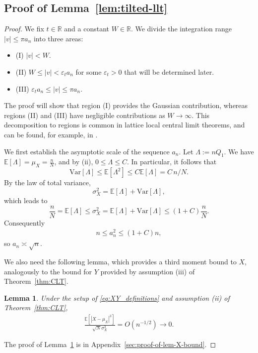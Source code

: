 \documentclass[11pt]{article}
\newtheorem{lem}[thm]{Lemma}
\numberwithin{equation}{section}
\newcommand{\reals}{\mathbb R}
\newcommand{\Var}[1]{\mathrm{Var}\left[ #1\right]}
\newcommand{\ex}[1]{\ensuremath{\mathbb{E}\left[ #1\right]}}
\begin{document}
\subsection{Proof of Lemma~\ref{lem:tilted-llt}}
\label{sec:proof-of-lem-tilted-llt}
\begin{proof}
    We fix $t \in \reals$ and a constant $W \in \reals$. We divide the integration range $|v|\leq \pi a_n$ into three areas:
\begin{itemize}
    \item (I) $|v| < W$.
    \item (II) $W \leq |v| < \varepsilon_t a_n$ for some $\varepsilon_t > 0$ that will be determined later. 
    \item (III) $\varepsilon_t a_n \leq |v| \le \pi a_n$.
\end{itemize}
The proof will show that region (I) provides the Gaussian contribution, whereas regions (II) and (III) have negligible contributions as $W \to \infty$. This decomposition to regions is common in lattice local central limit theorems, and can be found, for example, in \cite{petrov1975sums,holst1979unified,janson2001moment,klein2019conditional}.


We first establish the asymptotic scale of the sequence $a_n$. Let $\Lambda := nQ_1$. We have $\ex{\Lambda}= \mu_X = \frac{n}{N}$, and by (ii), $0 \le \Lambda \le C$. In particular, it follows that 
\[
    \Var{\Lambda} \leq \ex{\Lambda^2} \leq C \ex{\Lambda} = C\,n/N.
\]
By the law of total variance,
\[
\sigma_X^2=\ex{\Lambda}+\Var{\Lambda}, 
\]
which leads to
\[
\frac{n}{N} = \ex{\Lambda} \le \sigma_X^2 = \ex{\Lambda}+\Var{\Lambda} \le (1+C)\frac {n}{N}.
\]
Consequently 
\begin{align}
    \label{eq:a_n-bound}
n \le a_n^2 \le (1+C)n,
\end{align}
so $a_n\asymp \sqrt{n}$. 

We also need the following lemma, which provides a third moment bound to $X$, analogously to the bound for $Y$ provided by assumption (iii) of Theorem~\ref{thm:CLT}. 
\begin{lem}
    \label{lem:X-bound}
Under the setup of \eqref{eq:XY_definitions} and assumption (ii) of Theorem~\ref{thm:CLT},
\begin{align}
        \label{eq:X-bound}
    \frac{\ex{|X-\mu_X|^3}}{\sqrt{N} \sigma_X^3} = O(n^{-1/2}) \longrightarrow 0.
    \end{align}
\end{lem}
The proof of Lemma~\ref{lem:X-bound} is in Appendix~\ref{sec:proof-of-lem-X-bound}.
    

\end{proof}
\end{document}
